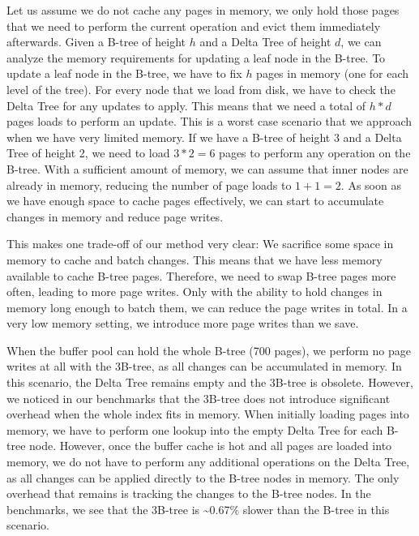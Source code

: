 Let us assume we do not cache any pages in memory, we only hold those pages that we need to perform the current operation and evict them immediately afterwards.
Given a B-tree of height $h$ and a Delta Tree of height $d$, we can analyze the memory requirements for updating a leaf node in the B-tree.
To update a leaf node in the B-tree, we have to fix $h$ pages in memory (one for each level of the tree).
For every node that we load from disk, we have to check the Delta Tree for any updates to apply.
This means that we need a total of $h * d$ pages loads to perform an update.
This is a worst case scenario that we approach when we have very limited memory.
If we have a B-tree of height 3 and a Delta Tree of height 2, we need to load $3 * 2 = 6$ pages to perform any operation on the B-tree.
With a sufficient amount of memory, we can assume that inner nodes are already in memory, reducing the number of page loads to $1 + 1 = 2$.
As soon as we have enough space to cache pages effectively, we can start to accumulate changes in memory and reduce page writes.

This makes one trade-off of our method very clear:
We sacrifice some space in memory to cache and batch changes.
This means that we have less memory available to cache B-tree pages.
Therefore, we need to swap B-tree pages more often, leading to more page writes.
Only with the ability to hold changes in memory long enough to batch them, we can reduce the page writes in total.
In a very low memory setting, we introduce more page writes than we save.

When the buffer pool can hold the whole B-tree (700 pages), we perform no page writes at all with the 3B-tree, as all changes can be accumulated in memory.
In this scenario, the Delta Tree remains empty and the 3B-tree is obsolete.
However, we noticed in our benchmarks that the 3B-tree does not introduce significant overhead when the whole index fits in memory.
When initially loading pages into memory, we have to perform one lookup into the empty Delta Tree for each B-tree node.
However, once the buffer cache is hot and all pages are loaded into memory, we do not have to perform any additional operations on the Delta Tree, as all changes can be applied directly to the B-tree nodes in memory.
The only overhead that remains is tracking the changes to the B-tree nodes.
In the benchmarks, we see that the 3B-tree is \textasciitilde0.67\% slower than the B-tree in this scenario.

